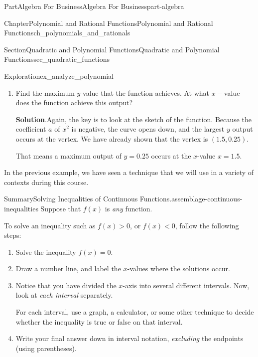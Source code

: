 \documentclass{tufte-book}
\newcommand{\blocktitlefont}{\relax}
\numberwithin{equation}{chapter}
\newcommand{\lt}{<}
\newcommand{\gt}{>}
\begin{document}
\begin{partptx}{Part}{Algebra For Business}{}{Algebra For Business}{}{}{part-algebra}
\begin{chapterptx}{Chapter}{Polynomial and Rational Functions}{}{Polynomial and Rational Functions}{}{}{ch_polynomials_and_rationals}
\begin{sectionptx}{Section}{Quadratic and Polynomial Functions}{}{Quadratic and Polynomial Functions}{}{}{sec_quadratic_functions}
\begin{exploration}{Exploration}{}{ex_analyze_polynomial}
\begin{enumerate}[font=\bfseries,label=(\alph*),ref=\alph*]
\begin{image}{0.125}{0.75}{0.125}{}
{
}%
\end{image}%
We can see that the function outputs values \emph{strictly} greater than \(0\) if and only if \(1\lt x\lt 2\), which corresponds to the interval \((1,2)\)%
\item{}Find the maximum \(y\)-value that the function achieves.  At what \(x-\)value does the function achieve this output?%
\par\smallskip%
\noindent\textbf{\blocktitlefont Solution}.\hypertarget{ex_analyze_polynomial-6-2}{}\quad{}Again, the key is to look at the sketch of the function.  Because the coefficient \(a\) of \(x^2\) is negative, the curve opens down, and the largest \(y\) output occurs at the vertex.  We have already shown that the vertex is \((1.5,0.25)\).%
\par
That means a maximum output of \(y=0.25\) occurs at the \(x\)-value \(x=1.5\).%
\end{enumerate}%
\end{exploration}%
In the previous example, we have seen a technique that we will use in a variety of contexts during this course.%
\begin{assemblage}{Summary}{Solving Inequalities of Continuous Functions.}{assemblage-continuous-inequalities}%
Suppose that \(f(x)\) is \emph{any} function.%
\par
To solve an inequality such as  \(f(x) \gt 0\), or \(f(x) \lt 0\), follow the following steps:%
\par
%
\begin{enumerate}
\item{}Solve the inequality \(f(x) = 0\).%
\item{}Draw a number line, and label the \(x\)-values where the solutions occur.%
\item{}Notice that you have divided the \(x\)-axis into several different intervals. Now, look at \emph{each interval} separately.%
\par
For each interval, use a graph, a calculator, or some other technique to decide whether the inequality is true or false on that interval.%
\item{}Write your final answer down in interval notation, \emph{excluding} the endpoints (using parentheses).%

\end{enumerate}
\end{assemblage}
\end{sectionptx}
\end{chapterptx}
\end{partptx}
\end{document}
